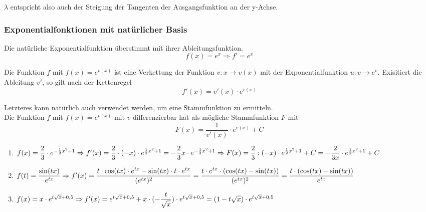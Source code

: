 \documentclass[main.tex]{subfiles}
\begin{document}
$\lambda$ entspricht also auch der Steigung der Tangenten der Ausgangsfunktion an der y-Achse.


\subsubsection{Exponentialfonktionen mit natürlicher Basis}

\begin{Theorem}
	Die natürliche Exponentialfunktion überstimmt mit ihrer Ableitungsfunktion.
	$$f(x)=e^x\Rightarrow f'=e^x$$
\end{Theorem}
\begin{Theorem}
	Die Funktion $f$ mit $f(x)=e^{v(x)}$ ist eine Verkettung der Funktion $v:x\rightarrow v(x)$ mit der Exponentialfunktion $u: v \rightarrow e^v$. Exisitiert die Ableitung $v'$, so gilt nach der Kettenregel\\
	$$f'(x)=v'(x)\cdot e^{v(x)}$$
\end{Theorem}

\begin{Bemerkung}
	Letzteres kann natürlich auch verwendet werden, um eine Stammfunktion zu ermitteln.\\
	Die Funktion $f$ mit $f(x)=e^{v(x)}$ mit $v$ differenzierbar hat als mögliche Stammfunktion $F$ mit
	$$F(x)=\dfrac{1}{v'(x)}\cdot e^{v(x)}+C$$
\end{Bemerkung}

\begin{Beispiel}
	\begin{enumerate}
		\item$f(x)=\dfrac{2}{3} \cdot e^{-\frac{1}{2}x^2+1}\\
		\Rightarrow f'(x)= \dfrac{2}{3}\cdot(-x)\cdot e^{\frac{1}{2}x^2+1}= -\dfrac{2}{3}x\cdot e^{-\frac{1}{2}x^2+1}\\
		\Rightarrow F(x)=\dfrac{2}{3}:(-x)\cdot e^{\frac{1}{2}x^2+1}+C=-\dfrac{2}{3x}\cdot e^{\frac{1}{2}x^2+1}+C$\\
		\item$f(t)=\dfrac{\sin(tx)}{e^{tx}}\\
		\Rightarrow f'(x)=\dfrac{t\cdot\cos(tx)\cdot e^{tx}-\sin(tx)\cdot t\cdot e^{tx}}{(e^{tx})^2}=\dfrac{t\cdot e^{tx}\cdot(\cos(tx)-\sin(tx))}{(e^{tx})^2}=\dfrac{t\cdot(\cos(tx)-\sin(tx))}{e^{tx}}\\$
		\item$f(x)=x\cdot e^{t\sqrt{x}+0,5}\\
		\Rightarrow f'(x)=e^{t\sqrt{x}+0,5}+x\cdot (-\dfrac{t}{\sqrt{x}})\cdot e^{t\sqrt{x}+0,5}=(1-t\sqrt{x})\cdot e^{t\sqrt{x}+0,5}$
	\end{enumerate}
\end{Beispiel}
\end{document}
